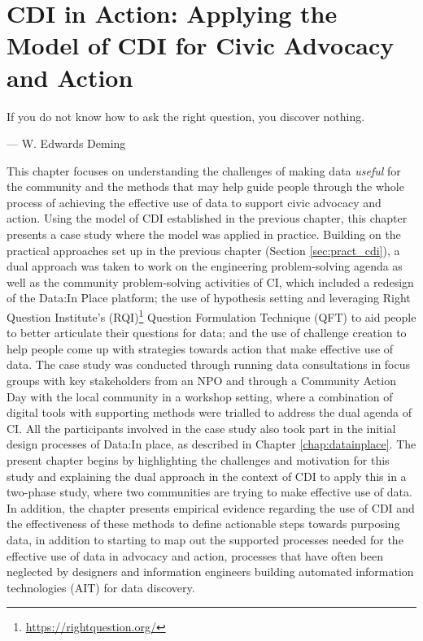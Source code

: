 \chapter[CDI in Action]{CDI in Action: Applying the Model of CDI for Civic Advocacy and Action}
\label{chap:cdi_in_action}
\ifpdf
    \graphicspath{{Chapter6/Figs/Raster/}{Chapter6/Figs/PDF/}{Chapter6/Figs/}}
\else
    \graphicspath{{Chapter6/Figs/Vector/}{Chapter6/Figs/}}
\fi

\epigraph{If you do not know how to ask the right question, you discover nothing.}{--- \textup{W. Edwards Deming}}

This chapter focuses on understanding the challenges of making data \textit{useful} for the community and the methods that may help guide people through the whole process of achieving the effective use of data to support civic advocacy and action. Using the model of CDI established in the previous chapter, this chapter presents a case study where the model was applied in practice. Building on the practical approaches set up in the previous chapter (Section \ref{sec:pract_cdi}), a dual approach was taken to work on the engineering problem-solving agenda as well as the community problem-solving activities of CI, which included a redesign of the Data:In Place platform; the use of hypothesis setting and leveraging Right Question Institute's (RQI)\footnote{\url{https://rightquestion.org/}} Question Formulation Technique (QFT) to aid people to better articulate their questions for data; and the use of challenge creation to help people come up with strategies towards action that make effective use of data. The case study was conducted through running data consultations in focus groups with key stakeholders from an NPO and through a Community Action Day with the local community in a workshop setting, where a combination of digital tools with supporting methods were trialled to address the dual agenda of CI. All the participants involved in the case study also took part in the initial design processes of Data:In place, as described in Chapter \ref{chap:datainplace}. The present chapter begins by highlighting the challenges and motivation for this study and explaining the dual approach in the context of CDI to apply this in a two-phase study, where two communities are trying to make effective use of data. In addition, the chapter presents empirical evidence regarding the use of CDI and the effectiveness of these methods to define actionable steps towards purposing data, in addition to starting to map out the supported processes needed for the effective use of data in advocacy and action, processes that have often been neglected by designers and information engineers building automated information technologies (AIT) for data discovery.
\clearpage

